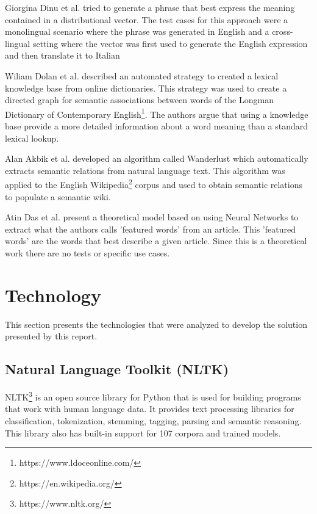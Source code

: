 Giorgina Dinu et al.\cite{dinu2014make} tried to generate a phrase that best express the meaning contained in a distributional vector.
The test cases for this approach were a monolingual scenario where the phrase was generated in English and a cross-lingual setting where the vector was first used to generate the English expression and then translate it to Italian

Wiliam Dolan et al.\cite{dolan1993automatically} described an automated strategy to created a lexical knowledge base from online dictionaries.
This strategy was used to create a directed graph for semantic associations between words of the Longman Dictionary of Contemporary English\footnote{https://www.ldoceonline.com/}.
The authors argue that using a knowledge base provide a more detailed information about a word meaning than a standard lexical lookup.

Alan Akbik et al.\cite{akbik2009wanderlust} developed an algorithm called Wanderlust which automatically extracts semantic relations from natural language text.
This algorithm was applied to the English Wikipedia\footnote{https://en.wikipedia.org/} corpus and used to obtain semantic relations to populate a semantic wiki.

Atin Das et al.\cite{das2008neural} present a theoretical model based on using Neural Networks to extract what the authors calls 'featured words' from an article.
This 'featured words' are the words that best describe a given article.
Since this is a theoretical work there are no tests or specific use cases.

\section{Technology}

This section presents the technologies that were analyzed to develop the solution presented by this report.

\subsection{Natural Language Toolkit (NLTK)}

NLTK\footnote{https://www.nltk.org/} is an open source library for Python that is used for building programs that work with human language data.
It provides text processing libraries for classification, tokenization, stemming, tagging, parsing and semantic reasoning.
This library also has built-in support for 107 corpora and trained models.

